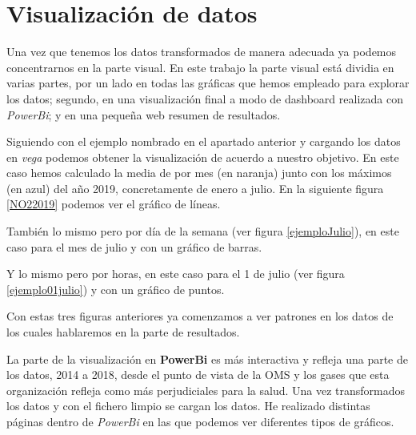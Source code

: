  

\section{Visualización de datos}
Una vez que tenemos los datos transformados de manera adecuada ya podemos concentrarnos en la parte visual. En este trabajo la parte visual está dividia en varias partes, por un lado en todas las gráficas que hemos empleado para explorar los datos; segundo, en una visualización final a modo de dashboard realizada con \textit{PowerBi};  y en una pequeña web resumen de resultados.


Siguiendo con el ejemplo nombrado en el apartado anterior y cargando los datos en \textit{vega} podemos obtener la visualización de acuerdo a nuestro objetivo. En este caso hemos calculado la media de  por mes (en naranja) junto con los máximos (en azul)  del año 2019, concretamente de enero a julio. En la siguiente figura \ref{NO22019} podemos ver el gráfico de líneas.



También lo mismo pero por día de la semana (ver figura \ref{ejemploJulio}), en este caso para el mes de julio y con un gráfico de barras.



Y lo mismo pero por horas, en este caso para el 1 de julio (ver figura \ref{ejemplo01julio}) y con un gráfico de puntos.

Con estas tres figuras anteriores ya comenzamos a ver patrones en los datos de los cuales hablaremos en la parte de resultados.

La parte de la visualización en \textbf{PowerBi} es más interactiva y refleja una parte de los datos, 2014 a 2018, desde el punto de vista de la OMS y los gases que esta organización refleja como más perjudiciales para la salud.  Una vez transformados los datos y con el fichero limpio se cargan los datos. He realizado distintas páginas dentro de \textit{PowerBi }en las que podemos ver diferentes tipos de gráficos.

